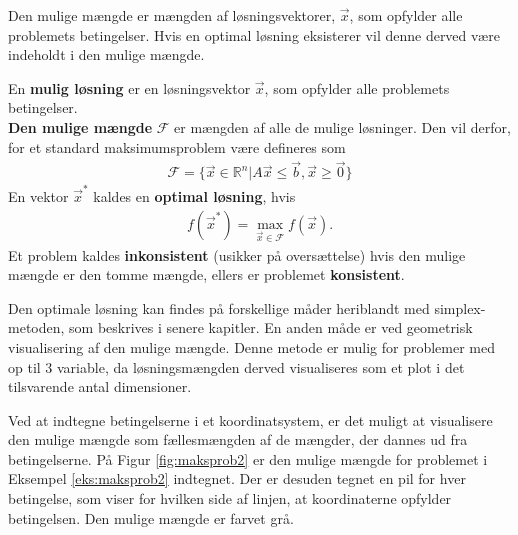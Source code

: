 Den mulige mængde er mængden af løsningsvektorer, $\vec{x}$, som opfylder alle problemets betingelser. Hvis en optimal løsning eksisterer vil denne derved være indeholdt i den mulige mængde.

\begin{defn}
En \textbf{mulig løsning} er en løsningsvektor $\vec{x}$, som opfylder alle problemets betingelser.\\
\textbf{Den mulige mængde} $\mathcal{F}$ er mængden af alle de mulige løsninger. Den vil derfor, for et standard maksimumsproblem være defineres som
\begin{align*}
\mathcal{F}=\{\vec{x} \in \mathds{R}^n|A\vec{x} \leq \vec{b}, \vec{x} \geq \vec{0}\}
\end{align*}
En vektor $\vec{x}^*$ kaldes en \textbf{optimal løsning}, hvis 
\begin{align}
	f(\vec{x}^*)=\max\limits_{\vec{x} \in \mathcal{F}}f(\vec{x}).
\end{align}
Et problem kaldes \textbf{inkonsistent} (usikker på oversættelse) hvis den mulige mængde er den tomme mængde, ellers er problemet \textbf{konsistent}. %
\end{defn}

Den optimale løsning kan findes på forskellige måder heriblandt med simplex-metoden, som beskrives i senere kapitler. En anden måde er ved geometrisk visualisering af den mulige mængde. Denne metode er mulig for problemer med op til 3 variable, da løsningsmængden derved visualiseres som et plot i det tilsvarende antal dimensioner. 

\begin{eks}
Ved at indtegne betingelserne i et koordinatsystem, er det muligt at visualisere den mulige mængde som fællesmængden af de mængder, der dannes ud fra betingelserne. På Figur \ref{fig:maksprob2} er den mulige mængde for problemet i Eksempel \ref{eks:maksprob2} indtegnet. Der er desuden tegnet en pil for hver betingelse, som viser for hvilken side af linjen, at koordinaterne opfylder betingelsen. Den mulige mængde er farvet grå.

\begin{center}
	
	\label{fig:maksprob2}
\end{center}

\end{eks}

